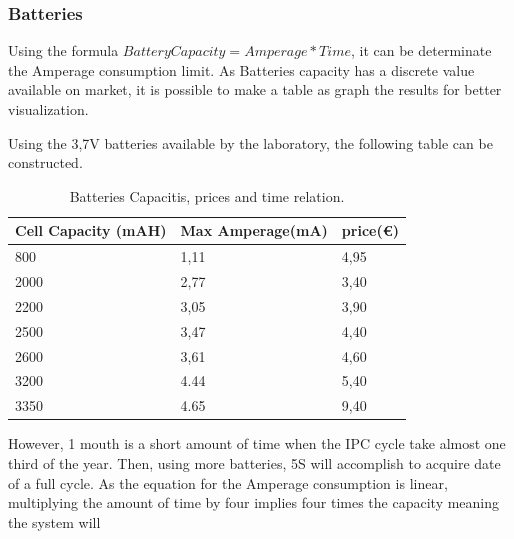 




\subsubsection{Batteries}

Using the formula \( Battery Capacity = Amperage * Time\), it can be determinate the 
Amperage consumption limit. As Batteries capacity has a discrete value available on market,
it is possible to make a table as graph the results for better visualization.

Using the 3,7V batteries available by the laboratory, the following table can be constructed. 
\\
\begin{table}[h!]
    \centering
    \begin{tabular}{l|l|l}

        Cell Capacity (mAH)& Max Amperage(mA) & price(€) \\
        \hline
        800                & 1,11 & 4,95\\
        2000               & 2,77 & 3,40\\
        2200               & 3,05 & 3,90\\
        2500               & 3,47 & 4,40\\
        2600               & 3,61 & 4,60\\
        3200               & 4.44 & 5,40\\
        3350               & 4.65 & 9,40\\
    \end{tabular}
    \caption{Batteries Capacitis, prices and time relation.}
    \label{table: Batteries Capacitis, prices and time relation.}
\end{table}

However, 1 mouth is a short amount of time when the IPC cycle take almost one third of 
the year. Then, using more batteries, 5S will accomplish to acquire date of a full cycle.
As the equation for the Amperage consumption is linear, multiplying the amount of time by 
four implies four times the capacity meaning the system will 



